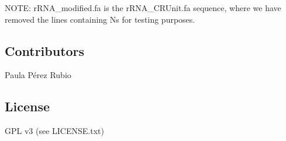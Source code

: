 N\+O\+TE\+: {\ttfamily r\+R\+N\+A\+\_\+modified.\+fa} is the {\ttfamily r\+R\+N\+A\+\_\+\+C\+R\+Unit.\+fa} sequence, where we have removed the lines containing N\textquotesingle{}s for testing purposes.

\subsection*{Contributors}

Paula Pérez Rubio

\subsection*{License}

G\+PL v3 (see L\+I\+C\+E\+N\+S\+E.\+txt) 